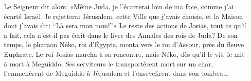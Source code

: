 Le Seigneur dit alors: «Même Juda, je l’écarterai loin de ma face,
	comme j’ai écarté Israël.
Je rejetterai Jérusalem, cette Ville que j’avais choisie,
	et la Maison dont j’avais dit: “Là sera mon nom!”»
Le reste des actions de Josias, tout ce qu’il a fait,
	cela n’est-il pas écrit dans le livre des Annales des rois de Juda?
De son temps, le pharaon Néko, roi d’Égypte,
	monta vers le roi d’Assour, près du fleuve Euphrate.
Le roi Josias marcha à sa rencontre,
	mais Néko, dès qu’il le vit, le mit à mort à Meguiddo.
Ses serviteurs le transportèrent mort sur un char,
	l’emmenèrent de Meguiddo à Jérusalem et l’ensevelirent dans son tombeau.
